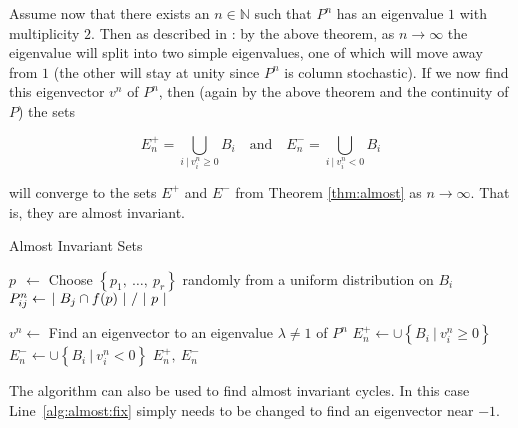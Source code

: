 Assume now that there exists an $n \in \mathbb{N}$ such that $P^n$ has an eigenvalue $1$ 
with multiplicity $2$. Then as described in \cite*{algGAIO}: by the above theorem, 
as $n \to \infty$ the eigenvalue will split into two simple eigenvalues, one of 
which will move away from $1$ (the other will stay at unity since $P^n$ is column 
stochastic). If we now find this eigenvector $v^n$ of $P^n$, then (again by the above 
theorem and the continuity of $P$) the sets 

\begin{equation}
    E_n^+ = \bigcup_{i\ \vert\ v_i^n \geq 0} B_i
    \quad \text{and} \quad 
    E_n^- = \bigcup_{i\ \vert\ v_i^n < 0} B_i 
\end{equation}
    
will converge to the sets $E^+$ and $E^-$ from Theorem \ref{thm:almost} as $n \to \infty$. 
That is, they are almost invariant. 

\begin{algorithm}
    \caption{Almost Invariant Sets}
    \label{alg:almost}
    \begin{spacing}{1.2}
        \begin{algorithmic}[1]

                \State $p\ \ \gets $ Choose $\left\{ p_1,\ \ldots,\ p_r \right\}$ randomly from a uniform distribution on $B_i$
                \State $P_{ij}^n \gets \left. |\ B_j \cap f(p)\ | \ \middle/\ |\ p\ | \right.$
            \EndFor
    
            \State $v^n \gets $ Find an eigenvector to an eigenvalue $\lambda \neq 1$ of $P^n$
            \label{alg:almost:fix}
            \State $E_n^+ \gets \cup \left\{ B_i\ \vert\ v_i^n \geq 0 \right\}$
            \State $E_n^- \gets \cup \left\{ B_i\ \vert\ v_i^n < 0 \right\}$
            \State \Return $E_n^+,\ E_n^-$
        \end{algorithmic}
    \end{spacing}
\end{algorithm}

\begin{remark}
    The algorithm can also be used to find almost invariant cycles. In this case 
    Line~\ref{alg:almost:fix} simply needs to be changed to find an eigenvector near $-1$. \\
\end{remark} 

